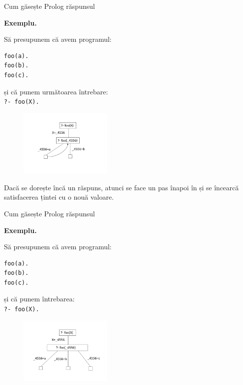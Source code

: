 \documentclass[xcolor=pdftex,romanian,colorlinks]{beamer}
\begin{document}
\begin{frame}[fragile]{Cum găsește Prolog răspunsul}


\textbf{\color{True} Exemplu.} 
\begin{multicols}{2}
Să presupunem că avem programul: 
\begin{verbatim}
foo(a). 
foo(b). 
foo(c).
\end{verbatim}
și că punem următoarea întrebare: \\
{\color{blue}\texttt{?- foo(X).}}
\columnbreak
\begin{figure}[h]
    \includegraphics[width=0.4\textwidth]{images/foo3}
\end{figure}
\end{multicols}

\vspace{-.2cm}
Dacă se dorește încă un răspuns, atunci se face un pas înapoi în  și se încearcă satisfacerea țintei cu o nouă valoare.
\end{frame}

\begin{frame}[fragile]{Cum găsește Prolog răspunsul}



\textbf{\color{True} Exemplu.} 
\begin{multicols}{2}
Să presupunem că avem programul: 
\begin{verbatim}
foo(a). 
foo(b). 
foo(c).
\end{verbatim}
și că punem întrebarea: \\
{\color{blue}\texttt{?- foo(X).}}
\columnbreak

\begin{figure}[h]
    \includegraphics[width=0.4\textwidth]{images/foo4}

\begin{center}
\end{center}
\end{figure}
\end{multicols}


\end{frame}
\end{document}
